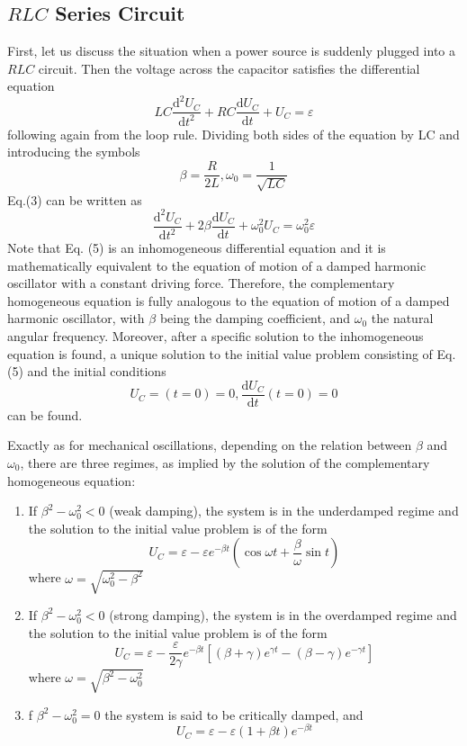 \documentclass[12pt]{article}
\begin{document}
\subsection{$RLC$ Series Circuit}
First, let us discuss the situation when a power source is suddenly plugged into a $RLC$
circuit. Then the voltage across the capacitor satisfies the differential equation
\begin{equation}
LC\frac{\mathrm{d^2}U_C}{\mathrm{d}t^2}+RC\frac{\mathrm{d}U_C}{\mathrm{d}t}+U_C=\varepsilon
\end{equation}
following again from the loop rule. Dividing both sides of the equation by LC and
introducing the symbols
\begin{equation}
\beta=\frac{R}{2L},\omega_0=\frac{1}{\sqrt{LC}}
\end{equation}
Eq.(3) can be written as 
\begin{equation}
\frac{\mathrm{d^2}U_C}{\mathrm{d}t^2}+2\beta\frac{\mathrm{d}U_C}{\mathrm{d}t}+\omega_0^2U_C=\omega_0^2\varepsilon
\end{equation}
Note that Eq. (5) is an inhomogeneous differential equation and it is mathematically equivalent to the equation of motion of a damped harmonic oscillator with a constant driving force. Therefore, the complementary homogeneous equation is fully analogous
to the equation of motion of a damped harmonic oscillator, with $\beta$ being the damping coefficient, and $\omega_0$ the natural angular frequency. Moreover, after a specific solution to the inhomogeneous equation is found, a unique solution to the initial value problem consisting of Eq.(5) and the initial conditions
\begin{equation}
U_C=(t=0)=0,\frac{\mathrm{d}U_C}{\mathrm{d}t}(t=0)=0
\end{equation}
can be found.
\par Exactly as for mechanical oscillations, depending on the relation between $\beta$ and $\omega_0$,
there are three regimes, as implied by the solution of the complementary homogeneous
equation:
\begin{enumerate}
\item If $\beta^2-\omega_0^2<0$ (weak damping), the system is in the underdamped regime and the
solution to the initial value problem is of the form
$$U_C=\varepsilon-\varepsilon e^{-\beta t}(\cos\omega t+\frac{\beta}{\omega}\sin t)$$
where $\omega=\sqrt{\omega_0^2-\beta^2}$
\item If $\beta^2-\omega_0^2<0$ (strong damping), the system is in the overdamped regime and the
solution to the initial value problem is of the form
$$U_C=\varepsilon-\frac{\varepsilon}{2\gamma}e^{-\beta t}[(\beta+\gamma)e^{\gamma t}-(\beta-\gamma)e^{-\gamma t}]$$
where $\omega=\sqrt{\beta^2-\omega_0^2}$
\item f $\beta^2-\omega_0^2=0$ the system is said to be critically damped, and 
\begin{equation}
U_C=\varepsilon-\varepsilon(1+\beta t)e^{-\beta t}
\end{equation}
\end{enumerate}
\end{document}

